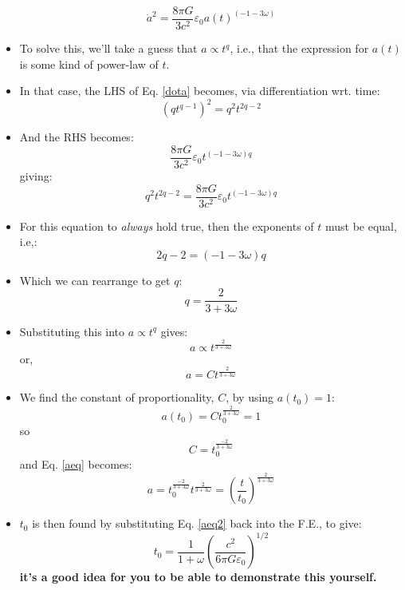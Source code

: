 \documentclass[11pt]{article}
\newcommand{\vep}[1]{\ensuremath{\varepsilon#1}}
\begin{document}
\begin{itemize}
\begin{equation}
\label{dota}
    \dot{a}^2 = \frac{8\pi G}{3c^2}\vep{_0}a(t)^{(-1-3\omega)}
\end{equation}
\item To solve this, we'll take a guess that $a\propto t^q$, i.e., that the expression for $a(t)$ is some kind of power-law of $t$.
\item In that case, the LHS of Eq. \ref{dota} becomes, via differentiation wrt. time:
\begin{equation}
(qt^{q-1})^2 = q^2t^{2q-2}
\end{equation}
\item And the RHS becomes:
\begin{equation}
\frac{8\pi G}{3c^2}\vep{_0}t^{(-1-3\omega)q}  
\end{equation}
giving:
\begin{equation}
    q^2t^{2q-2} = \frac{8\pi G}{3c^2}\vep{_0}t^{(-1-3\omega)q}  
\end{equation}
\item For this equation to {\it always} hold true, then the exponents of $t$ must be equal, i.e,:
\begin{equation}
    2q-2 = (-1-3\omega)q  
\end{equation}
\item Which we can rearrange to get $q$:
\begin{equation}
    q = \frac{2}{3+3\omega}  
\end{equation}
\item Substituting this into $a\propto t^q$ gives:
\begin{equation}
    a \propto t^{\frac{2}{3+3\omega}}  
\end{equation}
or,
\begin{equation}
    \label{aeq}
    a = Ct^{\frac{2}{3+3\omega}}  
\end{equation}
\item We find the constant of proportionality, $C$, by using $a(t_0) = 1$:
\begin{equation}
    a(t_0) = Ct_0^{\frac{2}{3+3\omega}} = 1  
\end{equation}
so 
\begin{equation}
    C = t_0^{\frac{-2}{3+3\omega}}  
\end{equation}
and Eq. \ref{aeq} becomes:
\begin{equation}
    \label{aeq2}
    a = t_0^{\frac{-2}{3+3\omega}}t^{\frac{2}{3+3\omega}} = \left(\frac{t}{t_0}\right)^{\frac{2}{3+3\omega}}
\end{equation}
\item $t_0$ is then found by substituting Eq. \ref{aeq2} back into the F.E., to give:
\begin{equation}
\label{t0}
    t_0 = \frac{1}{1+\omega}\left(\frac{c^2}{6\pi G\vep{_0}}\right)^{1/2}
\end{equation}
{\bf it's a good idea for you to be able to demonstrate this yourself.}
\end{itemize}
\end{document}
